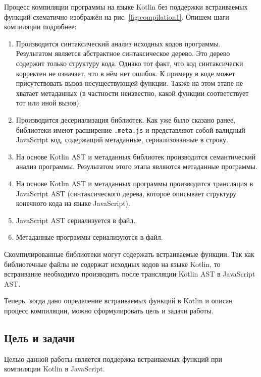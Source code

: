 Процесс компиляции программы на языке Kotlin без поддержки встраиваемых
функций схематично изображён на рис. \ref{fig:compilation1}. Опишем
шаги компиляции подробнее:
\begin{enumerate}
  \item Производится синтаксический анализ исходных кодов программы.
  Результатом является абстрактное синтаксическое дерево.
  Это дерево содержит только структуру кода. Однако
  тот факт, что код синтаксически корректен не означает,
  что в нём нет ошибок. К примеру в коде может
  присутствовать вызов несуществующей функции.
  Также на этом этапе не хватает метаданных (в частности
  неизвестно, какой функции соответствует тот или иной вызов).
  \item Производится десериализация библиотек.
  Как уже было сказано ранее, библиотеки имеют расширение
  \texttt{.meta.js} и представляют собой валидный
  JavaScript код, содержащий метаданные,
  сериализованные в строку.
  \item На основе Kotlin AST и метаданных библиотек
  производится семантический анализ программы.
  Результатом этого этапа являются метаданные программы.
  \item На основе Kotlin AST и метаданных программы
  производится трансляция в JavaScript AST (синтаксического
  дерева, которое описывает структуру конечного кода на языке
  JavaScript).
  \item JavaScript AST сериализуется в файл.
  \item Метаданные программы сериализуются в файл.
\end{enumerate}

Скомпилированные библиотеки могут содержать
встраиваемые функции. Так как библиотечные
файлы не содержат исходных кодов на языке Kotlin,
то встраивание необходимо производить
после трансляции Kotlin AST в JavaScript AST.

Теперь, когда дано определение встраиваемых функций в
Kotlin и описан процесс компиляции, можно
сформулировать цель и задачи работы.

\subsection{Цель и задачи}

Целью данной работы является поддержка встраиваемых
функций при компиляции Kotlin в JavaScript.

